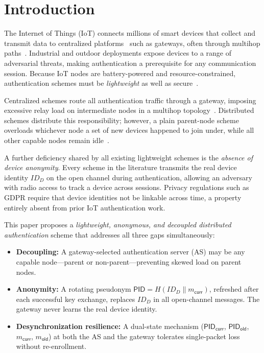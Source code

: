 \documentclass[conference]{IEEEtran}
\begin{document}
\section{Introduction}

The Internet of Things (IoT) connects millions of smart devices that collect
and transmit data to centralized platforms~\cite{zhou2021iot,kang2017iae}
such as gateways, often through multihop paths~\cite{lajnef2022wsn}.
Industrial and outdoor deployments expose devices to a range of adversarial
threats, making authentication a prerequisite for any communication session.
Because IoT nodes are battery-powered and resource-constrained,
authentication schemes must be \emph{lightweight} as well as
secure~\cite{alnahari2021auth,khatua2024puf}.

Centralized schemes route all authentication traffic through a gateway,
imposing excessive relay load on intermediate nodes in a multihop
topology~\cite{sheik2023auth,he2023lightweight,roy2025design}.  Distributed
schemes distribute this responsibility; however, a plain parent-node scheme
overloads whichever node a set of new devices happened to join under, while
all other capable nodes remain idle~\cite{rosa2023lightsae}.

A further deficiency shared by all existing lightweight schemes is the
\emph{absence of device anonymity}.  Every scheme in the literature
transmits the real device identity $ID_D$ on the open channel during
authentication, allowing an adversary with radio access to track a device
across sessions.  Privacy regulations such as GDPR require that device
identities not be linkable across time, a property entirely absent from
prior IoT authentication work.

This paper proposes a \emph{lightweight, anonymous, and decoupled
distributed authentication} scheme that addresses all three gaps
simultaneously:
\begin{itemize}
  \item \textbf{Decoupling:} A gateway-selected authentication server (AS)
    may be any capable node—parent or non-parent—preventing skewed load on
    parent nodes.
  \item \textbf{Anonymity:} A rotating pseudonym $\mathsf{PID} =
    H(ID_D \| m_\mathsf{curr})$, refreshed after each successful key
    exchange, replaces $ID_D$ in all open-channel messages.  The gateway
    never learns the real device identity.
  \item \textbf{Desynchronization resilience:} A dual-state mechanism
    ($\mathsf{PID}_\mathsf{curr}$, $\mathsf{PID}_\mathsf{old}$,
    $m_\mathsf{curr}$, $m_\mathsf{old}$) at both the AS and the gateway
    tolerates single-packet loss without re-enrollment.
\end{itemize}
\end{document}
